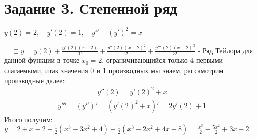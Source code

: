 \documentclass{article}
\begin{document}
\section{Задание 3. Степенной ряд}

$y(2) = 2, \quad y'(2) = 1, \quad y'' - (y')^2 = x$

$\quad\sqsupset y = y(2) + \frac{y'(2)(x-2)}{1!} + \frac{y''(2)(x-2)^2}{2!} + \frac{y'''(2)(x-2)^3}{3!}$ - Ряд Тейлора для данной функции в точке $x_0 = 2$, ограничивающийся только 4 первыми слагаемыми, итак значения 0 и 1 производных мы знаем, рассамотрим производные далее:
\begin{align}
    y''(2) = y'(2)^2 + x
\end{align}
\begin{align}    
    y''' = (y'')' = (y'(2)^2 + x)' = 2y'(2) + 1
\end{align}
Итого получим:
$y = 2 + x - 2 + \frac{1}{2}(x^3-3x^2+4) + \frac{1}{2}(x^3 - 2x^2 + 4x - 8) = \frac{x^3}{2}-\frac{5x^2}{2}+3x-2$ 
\end{document}
